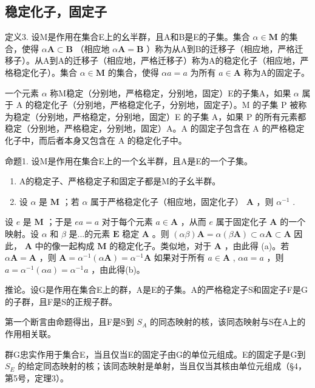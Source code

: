 \subsection{稳定化子，固定子}

定义3. 设M是作用在集合E上的幺半群，且A和B是E的子集。集合 \(\alpha \in \mathbf{M}\) 的集合，使得 \(\alpha \mathbf{A} \subset \mathbf{B}\) （相应地 \(\alpha \mathbf{A} = \mathbf{B}\) ）称为从A到B的迁移子（相应地，严格迁移子）。从A到A的迁移子（相应地，严格迁移子）称为A的稳定化子（相应地，严格稳定化子）。集合 \(\alpha \in \mathbf{M}\) 的集合，使得 \(\alpha a = a\) 为所有 \(a \in \mathbf{A}\) 称为A的固定子。

一个元素 \(\alpha\) 称M稳定（分别地，严格稳定，分别地，固定）E的子集A，如果 \(\alpha\) 属于 A 的稳定化子（分别地，严格稳定化子，分别地，固定子）。M 的子集 P 被称为稳定（分别地，严格稳定，分别地，固定）E 的子集 A，如果 P 的所有元素都稳定（分别地，严格稳定，分别地，固定）A。A 的固定子包含在 A 的严格稳定化子中，而后者本身又包含在 A 的稳定化子中。

命题1. 设M是作用在集合E上的一个幺半群，且A是E的一个子集。

\begin{enumerate}
\def\labelenumi{(\alph{enumi})}
\item
  A的稳定子、严格稳定子和固定子都是M的子幺半群。
\item
  设 \(\alpha\) 是 \(\mathbf{M}\) ；若 \(\alpha\) 属于严格稳定化子（相应地，固定化子） \(\mathbf{A}\) ，则 \(\alpha^{-1}\) .
\end{enumerate}

设 \(e\) 是 \(\mathbf{M}\) ；于是 \(ea = a\) 对于每个元素 \(a \in \mathbf{A}\) ，从而 \(e\) 属于固定化子 \(\mathbf{A}\) 的一个映射。设 \(\alpha\) 和 \(\beta\) 是...的元素 \(\mathbf{E}\) 稳定 \(\mathbf{A}\) 。则 \((\alpha\beta)\mathbf{A} = \alpha(\beta\mathbf{A}) \subset \alpha\mathbf{A} \subset \mathbf{A}\) 因此， \(\mathbf{A}\) 中的像一起构成 \(\mathbf{M}\) 的稳定化子。类似地，对于 \(\mathbf{A}\) ，由此得 (a)。若 \(\alpha\mathbf{A} = \mathbf{A}\) ，则 \(\mathbf{A} = \alpha^{-1}(\alpha\mathbf{A}) = \alpha^{-1}\mathbf{A}\) 如果对于所有 \(a \in \mathbf{A}\) , \(\alpha a = a\) ，则 \(a = \alpha^{-1}(\alpha a) = \alpha^{-1}a\) ，由此得(b)。

推论。设G是作用在集合E上的群，A是E的子集。A的严格稳定子S和固定子F是G的子群，且F是S的正规子群。

第一个断言由命题得出，且F是S到 \(S_{A}\) 的同态映射的核，该同态映射与S在A上的作用相关联。

群G忠实作用于集合E，当且仅当E的固定子由G的单位元组成。E的固定子是G到 \(S_{E}\) 的给定同态映射的核；该同态映射是单射，当且仅当其核由单位元组成（§4，第5号，定理3）。

